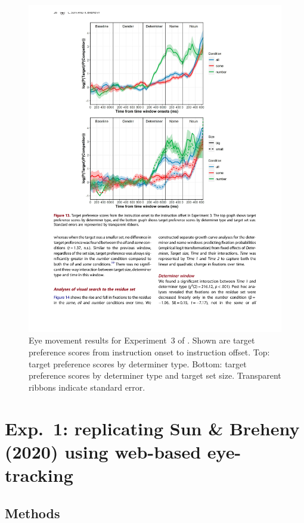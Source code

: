 \documentclass[10pt,letterpaper]{article}
\newcommand{\expref}[1]{Experiment~#1}
\begin{document}
\begin{figure}
\centering
\includegraphics[width=\columnwidth]{images/results-original}
\caption{Eye movement results for \expref{3} of . Shown are target preference scores from instruction onset to instruction offset. Top: target preference scores by determiner type. Bottom: target preference scores by determiner type and target set size. Transparent ribbons indicate standard error.} 
\label{fig:results-original}
\end{figure}


\section{Exp.~1: replicating Sun \& Breheny (2020) using web-based eye-tracking}

\subsection{Methods}
\end{document}
